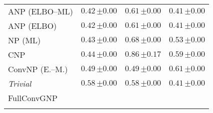 \begin{tabular}[t]{lccc}
ANP (ELBO--ML) & $0.42\,{ \scriptstyle \pm  0.00 }$ & $0.61\,{ \scriptstyle \pm  0.00 }$ & $0.41\,{ \scriptstyle \pm  0.00 }$ \\ 
ANP (ELBO) & $0.42\,{ \scriptstyle \pm  0.00 }$ & $0.61\,{ \scriptstyle \pm  0.00 }$ & $0.41\,{ \scriptstyle \pm  0.00 }$ \\ 
NP (ML) & $0.43\,{ \scriptstyle \pm  0.00 }$ & $0.68\,{ \scriptstyle \pm  0.00 }$ & $0.53\,{ \scriptstyle \pm  0.00 }$ \\ 
CNP & $0.44\,{ \scriptstyle \pm  0.00 }$ & $0.86\,{ \scriptstyle \pm  0.17 }$ & $0.59\,{ \scriptstyle \pm  0.00 }$ \\ 
ConvNP (E.--M.) & $0.49\,{ \scriptstyle \pm  0.00 }$ & $0.49\,{ \scriptstyle \pm  0.00 }$ & $0.61\,{ \scriptstyle \pm  0.00 }$ \\ 
{\normalshape \textit{Trivial}} & $0.58\,{ \scriptstyle \pm  0.00 }$ & $0.58\,{ \scriptstyle \pm  0.00 }$ & $0.41\,{ \scriptstyle \pm  0.00 }$ \\ 
FullConvGNP &  &  &  \\ 
\bottomrule \\ 
\end{tabular} 
